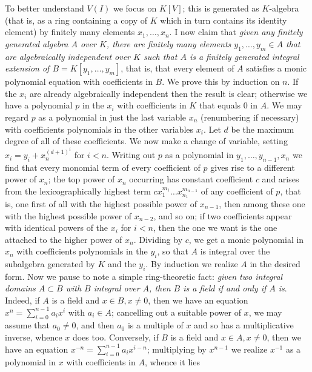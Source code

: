 \documentclass[10pt]{article}
\begin{document}
To better understand $V(I)$ we focus on $K[V]$; this is generated as
$K$-algebra (that is, as a ring containing a copy of $K$ which in turn
contains its identity element) by finitely many elements
$x_1,\ldots,x_n$. I now claim that {\sl given any finitely generated
  algebra $A$ over $K$, there are finitely many elements
  $y_1,\ldots,y_m\in A$ that are algebraically independent over $K$ such
  that $A$ is a finitely generated integral extension of
  $B=K[y_1,\ldots,y_m]$}, that is, that every element of $A$ satisfies a
monic polynomial equation with coefficients in $B$. We prove this by
induction on $n$. If the $x_i$ are already algebraically independent
then the result is clear; otherwise we have a polynomial $p$ in the
$x_i$ with coefficients in $K$ that equals 0 in $A$. We may regard $p$
as a polynomial in just the last variable $x_n$ (renumbering if
necessary) with coefficients polynomials in the other variables $x_i$.
Let $d$ be the maximum degree of all of these coefficients. We now make
a change of variable, setting $x_i = y_i + x_n^{(d+1)^i}$ for $i<n$.
Writing out $p$ as a polynomial in $y_1,\ldots,y_{n-1},x_n$ we find that
every monomial term of every coefficient of $p$ gives rise to a
different power of $x_n$; the top power of $x_n$ occurring has constant
coefficient $c$ and arises from the lexicographically highest term
$cx_1^{m_1}\ldots x_{n_1}^{m_{n-1}}$ of any coefficient of $p$, that is,
one first of all with the highest possible power of $x_{n-1}$, then
among these one with the highest possible power of $x_{n-2}$, and so on;
if two coefficients appear with identical powers of the $x_i$ for $i<n$,
then the one we want is the one attached to the higher power of $x_n$.
Dividing by $c$, we get a monic polynomial in $x_n$ with coefficients
polynomials in the $y_i$, so that $A$ is integral over the subalgebra
generated by $K$ and the $y_i$. By induction we realize $A$ in the
desired form. Now we pause to note a simple ring-theoretic fact: {\sl
  given two integral domains $A\subset B$ with $B$ integral over $A$,
  then $B$ is a field if and only if $A$ is}. Indeed, if $A$ is a field
and $x\in B,x\ne0$, then we have an equation $x^n = \sum_{i=0}^{n-1} a_i
x^i$ with $a_i\in A$; cancelling out a suitable power of $x$, we may
assume that $a_0\ne0$, and then $a_0$ is a multiple of $x$ and so has a
multiplicative inverse, whence $x$ does too. Conversely, if $B$ is a
field and $x\in A,x\ne0$, then we have an equation $x^{-n} =
\sum_{i=0}^{n-1} a_i x^{i-n}$; multiplying by $x^{n-1}$ we realize
$x^{-1}$ as a polynomial in $x$ with coefficients in $A$, whence it lies
\end{document}
